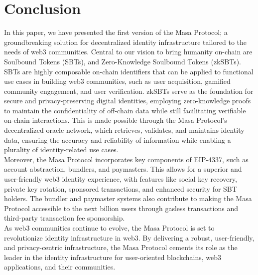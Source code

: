 \documentclass{article}
\begin{document}
\section{Conclusion}
In this paper, we have presented the first version of the Masa Protocol; a groundbreaking solution for decentralized identity infrastructure tailored to the needs of web3 communities. Central to our vision to bring humanity on-chain are Soulbound Tokens (SBTs), and Zero-Knowledge Soulbound Tokens (zkSBTs).
\\
\newline
SBTs are highly composable on-chain identifiers that can be applied to functional use cases in building web3 communities, such as user acquisition, gamified community engagement, and user verification. zkSBTs serve as the foundation for secure and privacy-preserving digital identities, employing zero-knowledge proofs to maintain the confidentiality of off-chain data while still facilitating verifiable on-chain interactions. This is made possible through the Masa Protocol's decentralized oracle network, which retrieves, validates, and maintains identity data, ensuring the accuracy and reliability of information while enabling a plurality of identity-related use cases.
\\
\newline
Moreover, the Masa Protocol incorporates key components of EIP-4337, such as account abstraction, bundlers, and paymasters. This allows for a superior and user-friendly web3 identity experience, with features like social key recovery, private key rotation, sponsored transactions, and enhanced security for SBT holders. The bundler and paymaster systems also contribute to making the Masa Protocol accessible to the next billion users through gasless transactions and third-party transaction fee sponsorship.
\\
\newline
As web3 communities continue to evolve, the Masa Protocol is set to revolutionize identity infrastructure in web3. By delivering a robust, user-friendly, and privacy-centric infrastructure, the Masa Protocol cements its role as the leader in the identity infrastructure for user-oriented blockchains, web3 applications, and their communities.




\end{document}
